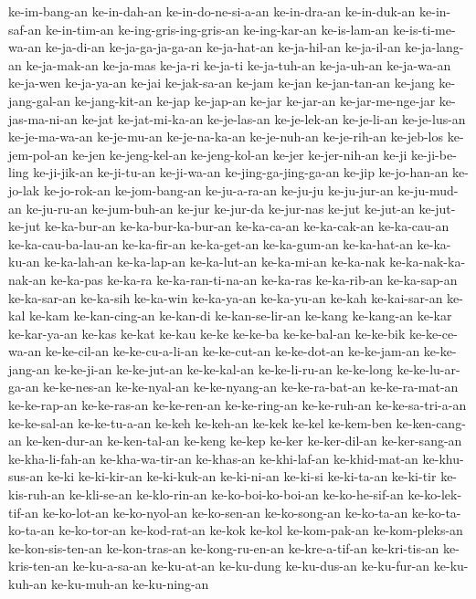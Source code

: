 {ke-im-bang-an ke-in-dah-an ke-in-do-ne-si-a-an ke-in-dra-an ke-in-duk-an
ke-in-saf-an ke-in-tim-an ke-ing-gris-ing-gris-an ke-ing-kar-an
ke-is-lam-an ke-is-ti-me-wa-an ke-ja-di-an ke-ja-ga-ja-ga-an ke-ja-hat-an
ke-ja-hil-an ke-ja-il-an ke-ja-lang-an ke-ja-mak-an ke-ja-mas ke-ja-ri
ke-ja-ti ke-ja-tuh-an ke-ja-uh-an ke-ja-wa-an ke-ja-wen ke-ja-ya-an ke-jai
ke-jak-sa-an ke-jam ke-jan ke-jan-tan-an ke-jang ke-jang-gal-an
ke-jang-kit-an ke-jap ke-jap-an ke-jar ke-jar-an ke-jar-me-nge-jar
ke-jas-ma-ni-an ke-jat ke-jat-mi-ka-an ke-je-las-an ke-je-lek-an
ke-je-li-an ke-je-lus-an ke-je-ma-wa-an ke-je-mu-an ke-je-na-ka-an
ke-je-nuh-an ke-je-rih-an ke-jeb-los ke-jem-pol-an ke-jen ke-jeng-kel-an
ke-jeng-kol-an ke-jer ke-jer-nih-an ke-ji ke-ji-be-ling ke-ji-jik-an
ke-ji-tu-an ke-ji-wa-an ke-jing-ga-jing-ga-an ke-jip ke-jo-han-an
ke-jo-lak ke-jo-rok-an ke-jom-bang-an ke-ju-a-ra-an ke-ju-ju ke-ju-jur-an
ke-ju-mud-an ke-ju-ru-an ke-jum-buh-an ke-jur ke-jur-da ke-jur-nas ke-jut
ke-jut-an ke-jut-ke-jut ke-ka-bur-an ke-ka-bur-ka-bur-an ke-ka-ca-an
ke-ka-cak-an ke-ka-cau-an ke-ka-cau-ba-lau-an ke-ka-fir-an ke-ka-get-an
ke-ka-gum-an ke-ka-hat-an ke-ka-ku-an ke-ka-lah-an ke-ka-lap-an
ke-ka-lut-an ke-ka-mi-an ke-ka-nak ke-ka-nak-ka-nak-an ke-ka-pas ke-ka-ra
ke-ka-ran-ti-na-an ke-ka-ras ke-ka-rib-an ke-ka-sap-an ke-ka-sar-an
ke-ka-sih ke-ka-win ke-ka-ya-an ke-ka-yu-an ke-kah ke-kai-sar-an ke-kal
ke-kam ke-kan-cing-an ke-kan-di ke-kan-se-lir-an ke-kang ke-kang-an ke-kar
ke-kar-ya-an ke-kas ke-kat ke-kau ke-ke ke-ke-ba ke-ke-bal-an ke-ke-bik
ke-ke-ce-wa-an ke-ke-cil-an ke-ke-cu-a-li-an ke-ke-cut-an ke-ke-dot-an
ke-ke-jam-an ke-ke-jang-an ke-ke-ji-an ke-ke-jut-an ke-ke-kal-an
ke-ke-li-ru-an ke-ke-long ke-ke-lu-ar-ga-an ke-ke-nes-an ke-ke-nyal-an
ke-ke-nyang-an ke-ke-ra-bat-an ke-ke-ra-mat-an ke-ke-rap-an ke-ke-ras-an
ke-ke-ren-an ke-ke-ring-an ke-ke-ruh-an ke-ke-sa-tri-a-an ke-ke-sal-an
ke-ke-tu-a-an ke-keh ke-keh-an ke-kek ke-kel ke-kem-ben ke-ken-cang-an
ke-ken-dur-an ke-ken-tal-an ke-keng ke-kep ke-ker ke-ker-dil-an
ke-ker-sang-an ke-kha-li-fah-an ke-kha-wa-tir-an ke-khas-an ke-khi-laf-an
ke-khid-mat-an ke-khu-sus-an ke-ki ke-ki-kir-an ke-ki-kuk-an ke-ki-ni-an
ke-ki-si ke-ki-ta-an ke-ki-tir ke-kis-ruh-an ke-kli-se-an ke-klo-rin-an
ke-ko-boi-ko-boi-an ke-ko-he-sif-an ke-ko-lek-tif-an ke-ko-lot-an
ke-ko-nyol-an ke-ko-sen-an ke-ko-song-an ke-ko-ta-an ke-ko-ta-ko-ta-an
ke-ko-tor-an ke-kod-rat-an ke-kok ke-kol ke-kom-pak-an ke-kom-pleks-an
ke-kon-sis-ten-an ke-kon-tras-an ke-kong-ru-en-an ke-kre-a-tif-an
ke-kri-tis-an ke-kris-ten-an ke-ku-a-sa-an ke-ku-at-an ke-ku-dung
ke-ku-dus-an ke-ku-fur-an ke-ku-kuh-an ke-ku-muh-an ke-ku-ning-an
}
